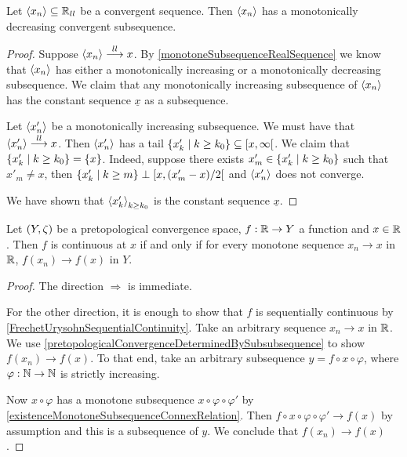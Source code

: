 \begin{lemma} \label{lowerLimitConvergenceDecreasingSubsequence}
Let $\left\langle x_n \right\rangle\subseteq \mathbb{R}_{ll}$ be a convergent sequence. Then $\left\langle x_n \right\rangle$ has a monotonically decreasing convergent subsequence.
\end{lemma}
\begin{proof}
Suppose $\left\langle x_n \right\rangle \overset{ll}{\longrightarrow} x$. By \ref{monotoneSubsequenceRealSequence} we know that $\left\langle x_n \right\rangle$ has either a monotonically increasing or a monotonically decreasing subsequence. We claim that any monotonically increasing subsequence of $\left\langle x_n \right\rangle$ has the constant sequence $\underline{x}$ as a subsequence.

Let $\left\langle x'_n \right\rangle$ be a monotonically increasing subsequence. We must have that $\left\langle x'_n \right\rangle \overset{ll}{\longrightarrow} x$. Then $\left\langle x'_n \right\rangle$ has a tail $\setbuilder{x'_k}{k \geq k_0}\subseteq \interval[co]{x,\infty}$. We claim that $\setbuilder{x'_k}{k \geq k_0} = \{x\}$. Indeed, suppose there exists $x'_m \in \setbuilder{x'_k}{k \geq k_0}$ such that $x'_m \neq x$, then $\setbuilder{x'_k}{k \geq m} \perp \interval[co]{x, (x'_m-x)/2}$ and $\left\langle x'_n \right\rangle$ does not converge.

We have shown that $\left\langle x'_k \right\rangle_{k\geq k_0}$ is the constant sequence $\underline{x}$.
\end{proof}

\begin{lemma} \label{monotoneContinuityImpliesContinuityRealDomain}
Let $\sSet{Y,\zeta}$ be a pretopological convergence space, $f: \mathbb{R}\to Y$ a function and $x\in \mathbb{R}$. Then $f$ is continuous at $x$ \textup{if and only if} for every monotone sequence $x_n\to x$ in $\mathbb{R}$, $f(x_n) \to f(x)$ in $Y$.
\end{lemma}
\begin{proof}
The direction $\Rightarrow$ is immediate.

For the other direction, it is enough to show that $f$ is sequentially continuous by \ref{FrechetUrysohnSequentialContinuity}. Take an arbitrary sequence $x_n\to x$ in $\mathbb{R}$. We use \ref{pretopologicalConvergenceDeterminedBySubsubsequence} to show $f(x_n) \to f(x)$. To that end, take an arbitrary subsequence $y = f\circ x\circ \varphi$, where $\varphi:\mathbb{N}\to \mathbb{N}$ is strictly increasing.

Now $x\circ \varphi$ has a monotone subsequence $x\circ \varphi\circ \varphi'$ by \ref{existenceMonotoneSubsequenceConnexRelation}. Then $f\circ x\circ \varphi\circ \varphi' \to f(x)$ by assumption and this is a subsequence of $y$. We conclude that $f(x_n) \to f(x)$.
\end{proof}

